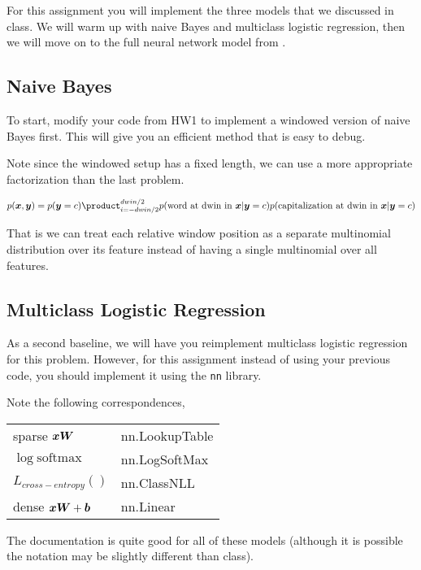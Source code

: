 \documentclass[11pt]{article}
\begin{document}
For this assignment you will
implement the three models that we
discussed in class. We will warm up
with naive Bayes and multiclass
logistic regression, then we will
move on to the full neural network
model from
.

\subsection{Naive Bayes}

To start, modify your code from HW1
to implement a windowed version of
naive Bayes first. This will give
you an efficient method that is easy
to debug.

Note since the windowed setup has a fixed length, we can use a more appropriate 
factorization than the last problem. 

\[ p(\boldx, \boldy) = p(\boldy=c)
\product_{i=-dwin/2}^{dwin/2}
p(\mathrm{word\ at\ dwin\ in\
}\boldx | \boldy =c)
p(\mathrm{capitalization\ at\ dwin\
  in\ }\boldx | \boldy =c) \]

That is we can treat each relative
window position as a separate
multinomial distribution over its
feature instead of having a single
multinomial over all features.


\subsection{Multiclass Logistic Regression}

As a second baseline, we will have
you reimplement multiclass logistic
regression for this
problem. However, for this
assignment instead of using your
previous code, you should implement
it using the \texttt{nn} library. 



Note the following correspondences,

 \begin{tabular}{ll}
   sparse $\boldsymbol{x} \boldsymbol{W}$ & nn.LookupTable \\ 
   $\log \mathrm{softmax}$ & nn.LogSoftMax \\ 
   $L_{cross-entropy}()$ & nn.ClassNLL \\ 
   dense $\boldsymbol{x} \boldsymbol{W} + \boldsymbol{b}$ & nn.Linear \\ 
 \end{tabular}

 The documentation is quite good for all of these 
 models (although it is possible the notation may 
 be slightly different than class). 
\end{document}
